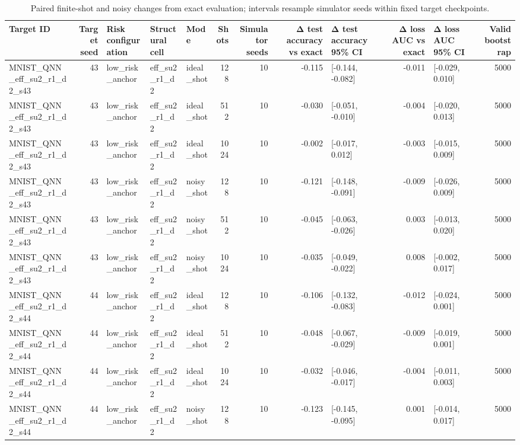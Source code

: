 \begin{table}[t]
\caption{Paired finite-shot and noisy changes from exact evaluation; intervals resample simulator seeds within fixed target checkpoints.}
\label{tab:noisy-changes}
\begin{tabular}{lrlllrrrlrlr}
\toprule
Target ID & Target seed & Risk configuration & Structural cell & Mode & Shots & Simulator seeds & Δ test accuracy vs exact & Δ test accuracy 95\% CI & Δ loss AUC vs exact & Δ loss AUC 95\% CI & Valid bootstrap \\
\midrule
MNIST\_QNN\_eff\_su2\_r1\_d2\_s43 & 43 & low\_risk\_anchor & eff\_su2\_r1\_d2 & ideal\_shot & 128 & 10 & -0.115 & [-0.144, -0.082] & -0.011 & [-0.029, 0.010] & 5000 \\
MNIST\_QNN\_eff\_su2\_r1\_d2\_s43 & 43 & low\_risk\_anchor & eff\_su2\_r1\_d2 & ideal\_shot & 512 & 10 & -0.030 & [-0.051, -0.010] & -0.004 & [-0.020, 0.013] & 5000 \\
MNIST\_QNN\_eff\_su2\_r1\_d2\_s43 & 43 & low\_risk\_anchor & eff\_su2\_r1\_d2 & ideal\_shot & 1024 & 10 & -0.002 & [-0.017, 0.012] & -0.003 & [-0.015, 0.009] & 5000 \\
MNIST\_QNN\_eff\_su2\_r1\_d2\_s43 & 43 & low\_risk\_anchor & eff\_su2\_r1\_d2 & noisy\_shot & 128 & 10 & -0.121 & [-0.148, -0.091] & -0.009 & [-0.026, 0.009] & 5000 \\
MNIST\_QNN\_eff\_su2\_r1\_d2\_s43 & 43 & low\_risk\_anchor & eff\_su2\_r1\_d2 & noisy\_shot & 512 & 10 & -0.045 & [-0.063, -0.026] & 0.003 & [-0.013, 0.020] & 5000 \\
MNIST\_QNN\_eff\_su2\_r1\_d2\_s43 & 43 & low\_risk\_anchor & eff\_su2\_r1\_d2 & noisy\_shot & 1024 & 10 & -0.035 & [-0.049, -0.022] & 0.008 & [-0.002, 0.017] & 5000 \\
MNIST\_QNN\_eff\_su2\_r1\_d2\_s44 & 44 & low\_risk\_anchor & eff\_su2\_r1\_d2 & ideal\_shot & 128 & 10 & -0.106 & [-0.132, -0.083] & -0.012 & [-0.024, 0.001] & 5000 \\
MNIST\_QNN\_eff\_su2\_r1\_d2\_s44 & 44 & low\_risk\_anchor & eff\_su2\_r1\_d2 & ideal\_shot & 512 & 10 & -0.048 & [-0.067, -0.029] & -0.009 & [-0.019, 0.001] & 5000 \\
MNIST\_QNN\_eff\_su2\_r1\_d2\_s44 & 44 & low\_risk\_anchor & eff\_su2\_r1\_d2 & ideal\_shot & 1024 & 10 & -0.032 & [-0.046, -0.017] & -0.004 & [-0.011, 0.003] & 5000 \\
MNIST\_QNN\_eff\_su2\_r1\_d2\_s44 & 44 & low\_risk\_anchor & eff\_su2\_r1\_d2 & noisy\_shot & 128 & 10 & -0.123 & [-0.145, -0.095] & 0.001 & [-0.014, 0.017] & 5000 \\

\end{tabular}
\end{table}
